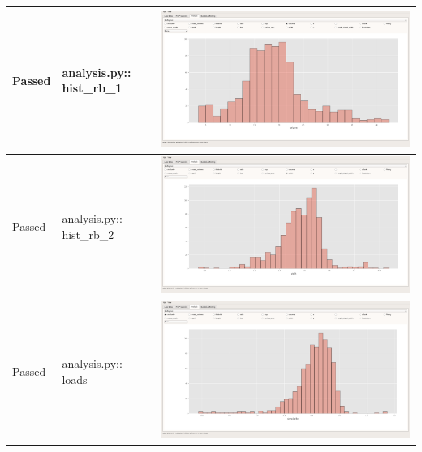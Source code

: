 \documentclass[11pt]{report}
\begin{document}
\begin{longtable}{|l|p{6.5cm}|C|}
\color{ForestGreen}Passed & analysis.py:: hist\_rb\_1 & \includegraphics[width=.9\linewidth]{./images/Screenshots/analysis_window_hist_rb_1.png}\\
\hline
\color{ForestGreen}Passed & analysis.py:: hist\_rb\_2 & \includegraphics[width=.9\linewidth]{./images/Screenshots/analysis_window_hist_rb_2.png}\\
\hline
\color{ForestGreen}Passed & analysis.py:: loads & \includegraphics[width=.9\linewidth]{./images/Screenshots/analysis_window_loads.png}\\
\hline

\end{longtable}
\end{document}
